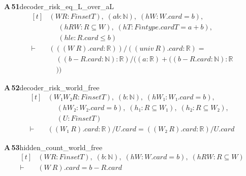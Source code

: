 \documentclass[conference]{IEEEtran}
\theoremstyle{definition}
\newcommand{\lean}[1]{\textsf{\footnotesize #1}}
\begin{document}
\noindent\textbf{A\,51}\quad\lean{decoder\_risk\_eq\_L\_over\_aL}
{\footnotesize\[ \begin{aligned}[t]
&(\mathit{W} \mathit{R} : \mathit{Finset} \mathit{T}),\; (\mathit{a} \mathit{b} : \mathbb{N} ),\; (\mathit{hW} : \mathit{W}.\mathit{card} = \mathit{b}),\\
&\quad \; (\mathit{hRW} : \mathit{R} \subseteq \mathit{W}),\; (\mathit{hT} : \mathit{Fintype}.\mathit{card} \mathit{T} = \mathit{a} + \mathit{b}),\\
&\quad \; (\mathit{hle} : \mathit{R}.\mathit{card} \leq \mathit{b})\\
\vdash\;&(((\mathit{W} \ \mathit{R}).\mathit{card} : \mathbb{R} )) / ((\mathit{univ} \ \mathit{R}).\mathit{card} : \mathbb{R} ) =\\
&\quad ((\mathit{b} - \mathit{R}.\mathit{card} : \mathbb{N} ) : \mathbb{R} ) / ((\mathit{a} : \mathbb{R} ) + ((\mathit{b} - \mathit{R}.\mathit{card} : \mathbb{N} ) : \mathbb{R}\\
&\quad ))
\end{aligned} \]}

\noindent\textbf{A\,52}\quad\lean{decoder\_risk\_world\_free}
{\footnotesize\[ \begin{aligned}[t]
&(\mathit{W₁} \mathit{W₂} \mathit{R} : \mathit{Finset} \mathit{T}),\; (\mathit{b} : \mathbb{N} ),\; (\mathit{hW₁} : \mathit{W₁}.\mathit{card} = \mathit{b}),\\
&\quad \; (\mathit{hW₂} : \mathit{W₂}.\mathit{card} = \mathit{b}),\; (\mathit{h₁} : \mathit{R} \subseteq \mathit{W₁}),\; (\mathit{h₂} : \mathit{R} \subseteq \mathit{W₂}),\\
&\quad \; (\mathit{U} : \mathit{Finset} \mathit{T})\\
\vdash\;&((\mathit{W₁} \ \mathit{R}).\mathit{card} : \mathbb{R} ) / \mathit{U}.\mathit{card} = ((\mathit{W₂} \ \mathit{R}).\mathit{card} : \mathbb{R} ) / \mathit{U}.\mathit{card}
\end{aligned} \]}

\noindent\textbf{A\,53}\quad\lean{hidden\_count\_world\_free}
{\footnotesize\[ \begin{aligned}[t]
&(\mathit{W} \mathit{R} : \mathit{Finset} \mathit{T}),\; (\mathit{b} : \mathbb{N} ),\; (\mathit{hW} : \mathit{W}.\mathit{card} = \mathit{b}),\; (\mathit{hRW} : \mathit{R} \subseteq \mathit{W})\\
\vdash\;&(\mathit{W} \ \mathit{R}).\mathit{card} = \mathit{b} - \mathit{R}.\mathit{card}
\end{aligned} \]}
\end{document}
